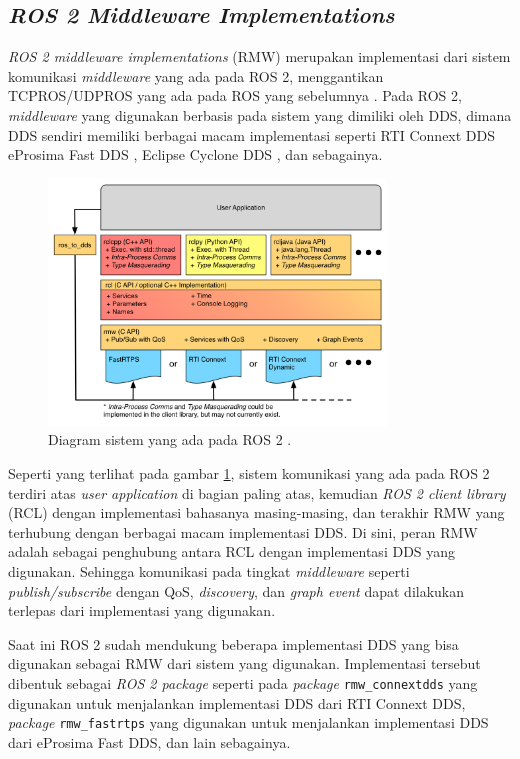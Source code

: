 \subsection{\emph{ROS 2 Middleware Implementations}}
\label{subsec:rmw}

\emph{ROS 2 middleware implementations} (RMW) merupakan implementasi dari sistem komunikasi \emph{middleware} yang ada pada ROS 2,
  menggantikan TCPROS/UDPROS yang ada pada ROS yang sebelumnya \citep{url:rmwdesign}.
Pada ROS 2, \emph{middleware} yang digunakan berbasis pada sistem yang dimiliki oleh DDS,
  dimana DDS sendiri memiliki berbagai macam implementasi seperti RTI Connext DDS \citep{url:rmwdesign} eProsima Fast DDS \citep{url:fastdds},
  Eclipse Cyclone DDS \citep{url:cyclonedds},
  dan sebagainya.

\begin{figure}
  \includegraphics[width=0.8\textwidth,keepaspectratio]{gambar/diagram-sistem-ros2.png}
  \caption{Diagram sistem yang ada pada ROS 2 \citep{url:ros2interfacesconcept}.}
  \label{fig:diagramsistemros2}
\end{figure}

Seperti yang terlihat pada gambar \ref{fig:diagramsistemros2},
  sistem komunikasi yang ada pada ROS 2 terdiri atas \emph{user application} di bagian paling atas,
  kemudian \emph{ROS 2 client library} (RCL) dengan implementasi bahasanya masing-masing,
  dan terakhir RMW yang terhubung dengan berbagai macam implementasi DDS.
Di sini, peran RMW adalah sebagai penghubung antara RCL dengan implementasi DDS yang digunakan.
Sehingga komunikasi pada tingkat \emph{middleware} seperti \emph{publish/subscribe} dengan QoS, \emph{discovery},
  dan \emph{graph event} dapat dilakukan terlepas dari implementasi yang digunakan.

Saat ini ROS 2 sudah mendukung beberapa implementasi DDS yang bisa digunakan sebagai RMW dari sistem yang digunakan.
  Implementasi tersebut dibentuk sebagai \emph{ROS 2 package} seperti pada \emph{package} \lstinline{rmw_connextdds} yang digunakan untuk menjalankan implementasi DDS dari RTI Connext DDS,
  \emph{package} \lstinline{rmw_fastrtps} yang digunakan untuk menjalankan implementasi DDS dari eProsima Fast DDS,
  dan lain sebagainya.
